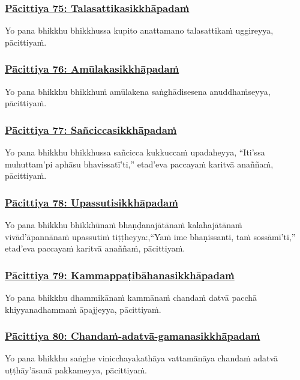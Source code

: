 \subsubsection*{\hyperref[exp75]{Pācittiya 75: Talasattikasikkhāpadaṁ}}
\label{pac75}
Yo pana bhikkhu bhikkhussa kupito anattamano talasattikaṁ uggireyya, pācittiyaṁ.

\subsubsection*{\hyperref[exp76]{Pācittiya 76: Amūlakasikkhāpadaṁ}}
\label{pac76}
Yo pana bhikkhu bhikkhuṁ amūlakena saṅghādisesena anuddhaṁseyya, pācittiyaṁ.

\subsubsection*{\hyperref[exp77]{Pācittiya 77: Sañciccasikkhāpadaṁ}}
\label{pac77}
Yo pana bhikkhu bhikkhussa sañcicca kukkuccaṁ upadaheyya, ``Iti'ssa muhuttam'pi aphāsu bhavissatī'ti,'' etad'eva paccayaṁ karitvā anaññaṁ, pācittiyaṁ.

\subsubsection*{\hyperref[exp78]{Pācittiya 78: Upassutisikkhāpadaṁ}}
\label{pac78}
Yo pana bhikkhu bhikkhūnaṁ bhaṇḍanajātānaṁ kalahajātānaṁ vivād'āpannānaṁ upassutiṁ tiṭṭheyya:,``Yaṁ ime bhaṇissanti, taṁ sossāmī'ti,'' etad'eva paccayaṁ karitvā anaññaṁ, pācittiyaṁ.

\subsubsection*{\hyperref[exp79]{Pācittiya 79: Kammappaṭibāhanasikkhāpadaṁ}}
\label{pac79}
Yo pana bhikkhu dhammikānaṁ kammānaṁ chandaṁ datvā pacchā khiyyanadhammaṁ āpajjeyya, pācittiyaṁ.

\subsubsection*{\hyperref[exp80]{Pācittiya 80: Chandaṁ-adatvā-gamanasikkhāpadaṁ}}
\label{pac80}
Yo pana bhikkhu saṅghe vinicchayakathāya vattamānāya chandaṁ adatvā uṭṭhāy'āsanā pakkameyya, pācittiyaṁ.

